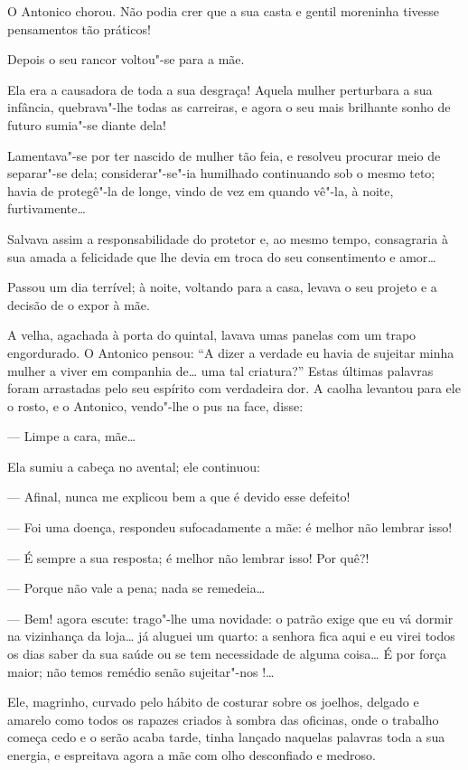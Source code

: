 O Antonico chorou. Não podia crer que a sua casta e gentil moreninha
tivesse pensamentos tão práticos!

Depois o seu rancor voltou"-se para a mãe.

Ela era a causadora de toda a sua desgraça! Aquela mulher perturbara a
sua infância, quebrava"-lhe todas as carreiras, e agora o seu mais
brilhante sonho de futuro sumia"-se diante dela!

Lamentava"-se por ter nascido de mulher tão feia, e resolveu procurar
meio de separar"-se dela; considerar"-se"-ia humilhado continuando sob o
mesmo teto; havia de protegê"-la de longe, vindo de vez em quando vê"-la,
à noite, furtivamente\ldots{}

Salvava assim a responsabilidade do protetor e, ao mesmo tempo,
consagraria à sua amada a felicidade que lhe devia em troca do seu
consentimento e amor\ldots{}

Passou um dia terrível; à noite, voltando para a casa, levava o seu
projeto e a decisão de o expor à mãe.

A velha, agachada à porta do quintal, lavava umas panelas com um trapo
engordurado. O Antonico pensou: ``A dizer a verdade eu havia de sujeitar
minha mulher a viver em companhia de\ldots{} uma tal criatura?'' Estas
últimas palavras foram arrastadas pelo seu espírito com verdadeira dor.
A caolha levantou para ele o rosto, e o Antonico, vendo"-lhe o pus na
face, disse:

--- Limpe a cara, mãe\ldots{}

Ela sumiu a cabeça no avental; ele continuou:

--- Afinal, nunca me explicou bem a que é devido esse defeito!

--- Foi uma doença, respondeu sufocadamente a mãe: é melhor não lembrar
isso!

--- É sempre a sua resposta; é melhor não lembrar isso! Por quê?!

--- Porque não vale a pena; nada se remedeia\ldots{}

--- Bem! agora escute: trago"-lhe uma novidade: o patrão exige que eu vá
dormir na vizinhança da loja\ldots{} já aluguei um quarto: a senhora fica
aqui e eu virei todos os dias saber da sua saúde ou se tem necessidade
de alguma coisa\ldots{} É por força maior; não temos remédio senão
sujeitar"-nos !\ldots{}

Ele, magrinho, curvado pelo hábito de costurar sobre os joelhos, delgado
e amarelo como todos os rapazes criados à sombra das oficinas, onde o
trabalho começa cedo e o serão acaba tarde, tinha lançado naquelas
palavras toda a sua energia, e espreitava agora a mãe com olho
desconfiado e medroso.


